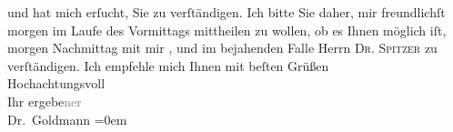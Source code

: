 \begin{ledgroupsized}[t]{13cm}
               und hat mich erſucht, Sie zu verſtändigen. Ich bitte Sie daher, mir freundlichſt
                  morgen im Laufe des Vormittags
               mittheilen zu {\pb}wollen, ob es Ihnen möglich iſt,
                  morgen{ }Nachmittag mit mir \label{K_L02641-1v}\label{K_L02641-1h}, und im bejahenden Falle Herrn \textsc{Dr. Spitzer} zu verſtändigen.\pend
           \pstart
           Ich empfehle mich Ihnen mit beſten Grüßen {\\[\baselineskip]}Hochachtungsvoll {\\[\baselineskip]}Ihr
                  ergebe\textcolor{gray}{ner}{\\[\baselineskip]}\spacefill\mbox{Dr. Goldmann}\pend
           \leftskip=0em{}
         
         \endnumbering{}\end{ledgroupsized}  \newcommand{\dateiname}{L02641}\newcommand{\titel}{Paul Goldmann an Arthur Schnitzler, 25. 6. 1889}\newcommand{\editorInnen}{Martin Anton Müller und Laura Untner}
      